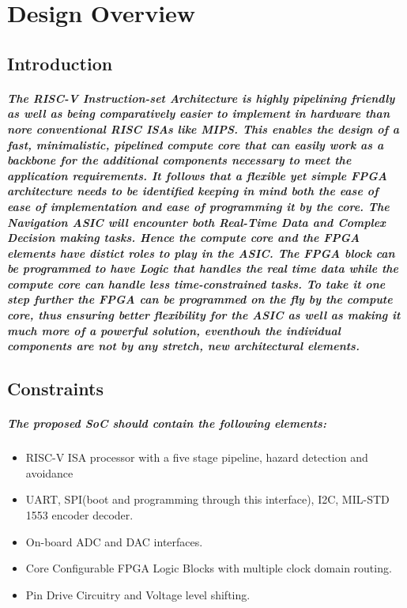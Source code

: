 \documentclass[12pt,a4paper]{report}
\begin{document}
\chapter{Design Overview}
\section{Introduction}
\paragraph{\textrm{\textmd{
The RISC-V Instruction-set Architecture is highly pipelining friendly as well as being comparatively easier to implement in hardware than nore conventional RISC ISAs like MIPS. This enables the design of a fast, minimalistic, pipelined compute core that can easily work as a backbone for the additional components necessary to meet the application requirements. It follows that a flexible yet simple FPGA architecture needs to be identified keeping in mind both the ease of ease of implementation and ease of programming it by the core. The Navigation ASIC will encounter both Real-Time Data and Complex Decision making tasks. Hence the compute core and the FPGA elements have distict roles to play in the ASIC. The FPGA block can be programmed to have Logic that handles the real time data while the compute core can handle less time-constrained tasks. To take it one step further the FPGA can be programmed on the fly by the compute core, thus ensuring better flexibility for the ASIC as well as making it much more of a powerful solution, eventhouh the individual components are not by any stretch, new architectural elements.}}}
\section{Constraints}
\paragraph{\textrm{\textmd{The proposed SoC should contain the following elements:}}}
\begin{itemize}
	\item RISC-V ISA processor with a five stage pipeline, hazard detection and avoidance
	\item UART, SPI(boot and programming through this interface), I2C, MIL-STD 1553 encoder decoder.
	\item On-board ADC and DAC interfaces. 
	\item Core Configurable FPGA Logic Blocks with multiple clock domain routing.
	\item Pin Drive Circuitry and Voltage level shifting.
\end{itemize}
\end{document}
